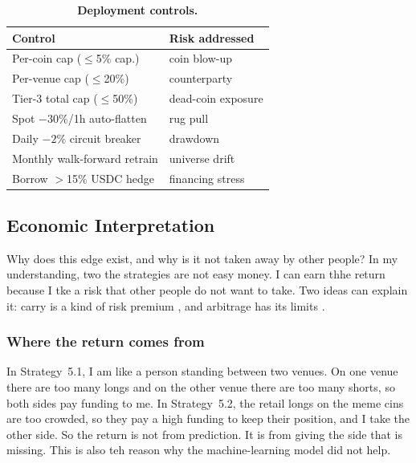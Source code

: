 \documentclass[10pt,twocolumn,a4paper]{article}
\begin{document}
\begin{table}[H]
  \centering
  \caption{\textbf{Deployment controls.}}
  \label{tab:checklist}
  \begin{tabular}{ll}
    \toprule
    \textbf{Control} & \textbf{Risk addressed} \\
    \midrule
    Per-coin cap ($\le$5\% cap.)   & coin blow-up \\
    Per-venue cap ($\le$20\%)      & counterparty \\
    Tier-3 total cap ($\le$50\%)   & dead-coin exposure \\
    Spot $-30\%$/1h auto-flatten   & rug pull \\
    Daily $-2\%$ circuit breaker   & drawdown \\
    Monthly walk-forward retrain   & universe drift \\
    Borrow $>$15\% USDC hedge      & financing stress \\
    \bottomrule
  \end{tabular}
\end{table}


\subsection{Economic Interpretation}
\label{sec:econ}

Why does this edge exist, and why is it not taken away by other people?  In my
understanding, two the strategies are not easy money.  I can earn thhe return because
I tke a risk that other people do not want to take.  Two ideas can explain it: carry
is a kind of risk premium \cite{koijen2018carry}, and arbitrage has its limits
\cite{shleifer1997limits}.

\subsubsection{Where the return comes from}

In Strategy~5.1, I am like a person standing between two venues.  On one venue there
are too many longs and on the other venue there are too many shorts, so both sides
pay funding to me.  In Strategy~5.2, the retail longs on the meme cins are too
crowded, so they pay a high funding to keep their position, and I take the other
side.  So the return is not from prediction.  It is from giving the side that is
missing.  This is also teh reason why the machine-learning model did not help.
\end{document}
